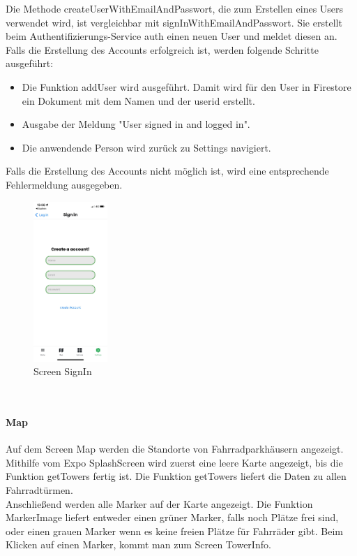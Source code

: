 Die Methode createUserWithEmailAndPasswort, die zum Erstellen eines Users verwendet wird, ist vergleichbar mit signInWithEmailAndPasswort. Sie erstellt beim Authentifizierungs-Service auth einen neuen User und meldet diesen an. Falls die Erstellung des Accounts erfolgreich ist, werden folgende Schritte ausgeführt:
\begin{itemize}
  \item Die Funktion addUser wird ausgeführt. Damit wird für den User in Firestore ein Dokument mit dem Namen und der userid erstellt.
  \item Ausgabe der Meldung "User signed in and logged in".
  \item Die anwendende Person wird zurück zu Settings navigiert.
\end{itemize}
Falls die Erstellung des Accounts nicht möglich ist, wird eine entsprechende Fehlermeldung ausgegeben.\\
\begin{figure}[H]
  \centering
  \includegraphics[width=0.25\textwidth]{images/app-screenshots/screenregister.png}
  \caption{Screen SignIn}
  \label{fig:signin}
\end{figure}
\mbox{}\\

\paragraph{Map}Auf dem Screen Map werden die Standorte von Fahrradparkhäusern angezeigt.\\
Mithilfe vom Expo SplashScreen wird zuerst eine leere Karte angezeigt, bis die Funktion getTowers fertig ist. Die Funktion getTowers liefert die Daten zu allen Fahrradtürmen. \\
Anschließend werden alle Marker auf der Karte angezeigt. Die Funktion MarkerImage liefert entweder einen grüner Marker, falls noch Plätze frei sind, oder einen grauen Marker wenn es keine freien Plätze für Fahrräder gibt. Beim Klicken auf einen Marker, kommt man zum Screen TowerInfo.\\

